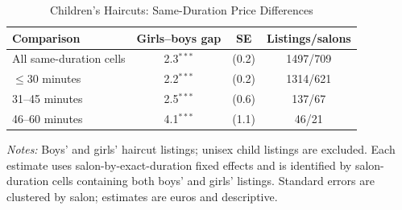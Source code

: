 \begin{table}[htbp]
  \centering
  \caption{Children's Haircuts: Same-Duration Price Differences}
  \label{tab:children_within_duration_gaps}
  \small
\begin{tabular}{lccc}
\hline
Comparison & Girls--boys gap & SE & Listings/salons \\
\hline
All same-duration cells & 2.3$^{***}$ & (0.2) & 1497/709 \\
\hline
$\leq$30 minutes & 2.2$^{***}$ & (0.2) & 1314/621 \\
31--45 minutes & 2.5$^{***}$ & (0.6) & 137/67 \\
46--60 minutes & 4.1$^{***}$ & (1.1) & 46/21 \\
\hline
\end{tabular}

\begin{minipage}{0.94\linewidth}
\footnotesize
\textit{Notes:} Boys' and girls' haircut listings; unisex child listings are excluded.
Each estimate uses salon-by-exact-duration fixed effects and is identified by salon-duration cells containing both boys' and girls' listings.
Standard errors are clustered by salon; estimates are euros and descriptive.
\end{minipage}
\end{table}
